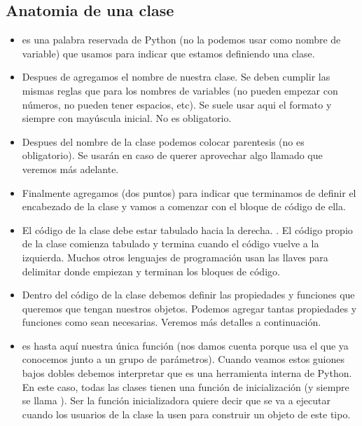 \documentclass[a5paper,9pt,spanish]{sphinxmanual}
\begin{document}
\subsection{Anatomia de una clase}
\label{\detokenize{class:anatomia-de-una-clase}}\begin{itemize}
\item {} 
\sphinxAtStartPar
{} es una palabra reservada de Python (no la podemos usar como nombre de variable)
que usamos para indicar que estamos definiendo una clase.

\item {} 
\sphinxAtStartPar
Despues de  agregamos el nombre de nuestra clase. Se deben cumplir las mismas
reglas que para los nombres de variables (no pueden empezar con números, no pueden tener
espacios, etc). Se suele usar aqui el formato  y siempre con mayúscula inicial.
No es obligatorio.

\item {} 
\sphinxAtStartPar
Despues del nombre de la clase podemos colocar parentesis (no es obligatorio). Se usarán
en caso de querer aprovechar algo llamado  que veremos más adelante.

\item {} 
\sphinxAtStartPar
Finalmente agregamos \sphinxstyleemphasis{:} (dos puntos) para indicar que terminamos de definir el encabezado
de la clase y vamos a comenzar con el bloque de código de ella.

\item {} 
\sphinxAtStartPar
El código de la clase debe estar tabulado hacia la derecha. . El código propio de
la clase comienza tabulado y termina cuando el código vuelve a la izquierda. Muchos otros
lenguajes de programación usan las llaves \sphinxcode{\sphinxupquote{\{\}}} para delimitar donde empiezan y terminan
los bloques de código.

\item {} 
\sphinxAtStartPar
Dentro del código de la clase debemos definir las propiedades y funciones que queremos que
tengan nuestros objetos. Podemos agregar tantas propiedades y funciones como sean necesarias.
Veremos más detalles a continuación.

\item {} 
\sphinxAtStartPar
{} es hasta aquí nuestra única función (nos damos cuenta porque usa el  que
ya conocemos junto a un grupo de parámetros). Cuando veamos estos guiones bajos dobles
debemos interpretar que es una herramienta interna de Python. En este caso, todas las clases
tienen una función de inicialización (y siempre se llama ).
Ser la función inicializadora quiere decir que se va a ejecutar cuando
los usuarios de la clase la usen para construir un objeto de este tipo.


\end{itemize}
\end{document}
